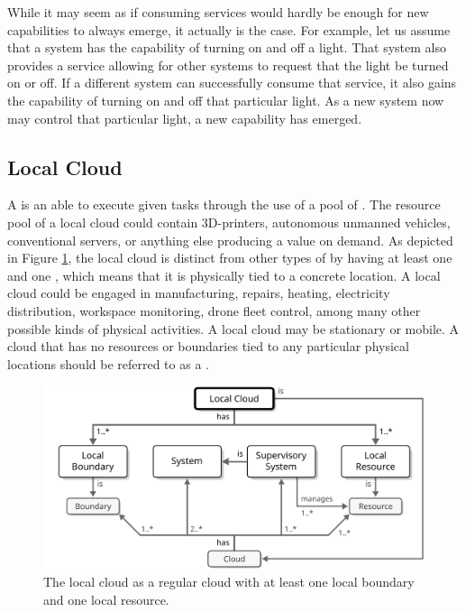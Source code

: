 While it may seem as if consuming services would hardly be enough for new capabilities to always emerge, it actually is the case.
For example, let us assume that a system has the capability of turning on and off a light.
That system also provides a service allowing for other systems to request that the light be turned on or off.
If a different system can successfully consume that service, it also gains the capability of turning on and off that particular light.
As a new system now may control that particular light, a new capability has emerged.

\subsection{Local Cloud}
\label{sec:concepts:local-cloud}

A  is an   able to execute given tasks through the use of a pool of .
The resource pool of a local cloud could contain 3D-printers, autonomous unmanned vehicles, conventional servers, or anything else producing a value on demand.
As depicted in Figure \ref{fig:local-cloud}, the local cloud is distinct from other types of  by having at least one  and one , which means that it is physically tied to a concrete location.
A local cloud could be engaged in manufacturing, repairs, heating, electricity distribution, workspace monitoring, drone fleet control, among many other possible kinds of physical activities.
A local cloud may be stationary or mobile.
A cloud that has no resources or boundaries tied to any particular physical locations should be referred to as a .

\vfill

\begin{figure}[ht!]
  \centering
  \includegraphics[scale=0.9]{figures/local-cloud}
  \caption{
    The local cloud as a regular cloud with at least one local boundary and one local resource.
  }
  \label{fig:local-cloud}
\end{figure}

